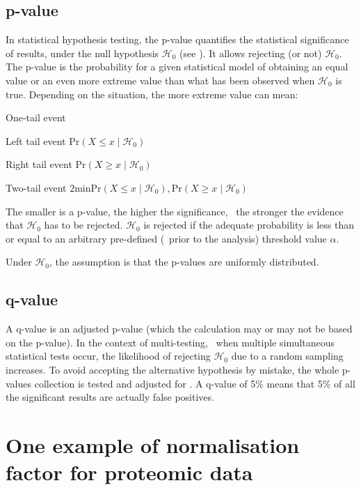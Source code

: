 \subsection{p-value}\label{p-value}
In statistical hypothesis testing,
the p-value quantifies the statistical significance of results,
under the null hypothesis $\mathcal{H}_0$ (see ).
It allows rejecting (or not) $\mathcal{H}_0$.
The p-value is the probability for a given statistical model of obtaining
an equal value or an even more extreme value than what has been observed
when $\mathcal{H}_0$ is true.
Depending on the situation,
the more extreme value can mean:
\begin{eqlist}
        \item[One-tail event]
            \begin{eqlist}
            \item[Left tail event]  $\text{Pr}(X \leq x \mid \mathcal{H}_0)$
            \item[Right tail event] $\text{Pr}(X \geq x \mid \mathcal{H}_0)$
            \end{eqlist}
        \item[Two-tail event] $2\text{min}{\text{Pr}(X \leq x \mid \mathcal{H}_0),%
            \text{Pr}(X \geq x \mid \mathcal{H}_0)}$
\end{eqlist}
The smaller is a p-value,
the higher the significance, \ie\
the stronger the evidence that $\mathcal{H}_0$ has to be rejected.
$\mathcal{H}_0$ is rejected if the adequate probability is less than or equal to
an arbitrary pre-defined (\ie\ prior to the analysis) threshold value $\alpha$.

Under $\mathcal{H}_0$,
the assumption is that the p-values are uniformly distributed.

\subsection{q-value}\label{q-value}\label{multitesting}
A q-value is an adjusted p-value
(which the calculation may or may not be based on the p-value).
In the context of multi-testing,
\ie\ when multiple simultaneous statistical tests occur,
the likelihood of rejecting $\mathcal{H}_0$ due to a random sampling increases.
To avoid accepting the alternative hypothesis by mistake,
the whole p-values collection is tested and adjusted for .
A q-value of 5\% means that 5\% of all the significant results
are actually false positives.

\section{One example of normalisation factor for proteomic data}

